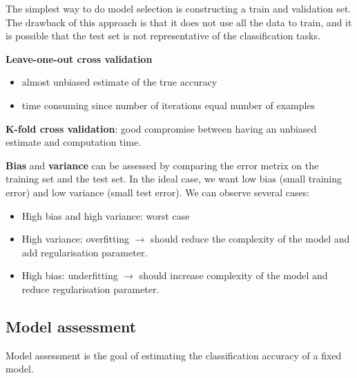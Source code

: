 The simplest way to do model selection is constructing a train and validation set. The drawback of this approach is that it does not use all the data to train, and it is possible that the test set is not representative of the classification tasks.

\textbf{Leave-one-out cross validation}
\begin{itemize}
	\item almost unbiased estimate of the true accuracy
	\item time consuming since number of iterations equal number of examples
\end{itemize}

\textbf{K-fold cross validation}: good compromise between having an unbiased estimate and computation time.

\textbf{Bias} and \textbf{variance} can be assessed by comparing the error metrix on the training set and the test set. In the ideal case, we want low bias (small training error) and low variance (small test error). We can observe several cases:
\begin{itemize}
	\item High bias and high variance: worst case
	\item High variance: overfitting $\rightarrow$ should reduce the complexity of the model and add regularisation parameter.
	\item High bias: underfitting $\rightarrow$ should increase complexity of the model and reduce regularisation parameter.
\end{itemize}

\subsection{Model assessment}
Model assessment is the goal of estimating the classification accuracy of a fixed model.

\afterpage{\null\newpage}
